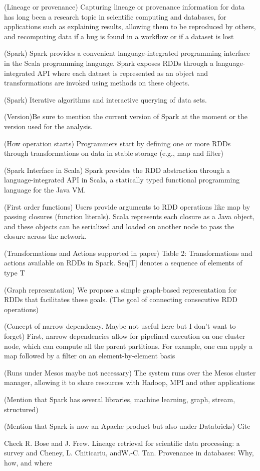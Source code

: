 (Lineage or provenance) Capturing lineage or provenance information for data has long been a research topic in scientific computing and databases, for applications such as explaining results, allowing them to be reproduced by others, and recomputing data if a bug is found in a workflow or if a dataset is lost \cite{Zaharia2012a}

(Spark) Spark provides a convenient language-integrated programming interface in the Scala programming language. Spark exposes RDDs through a language-integrated API where each dataset is represented as an object and transformations are invoked using methods on these objects. \cite{Zaharia2012a}

(Spark) Iterative algorithms and interactive querying of data sets.

(Version)Be sure to mention the current version of Spark at the moment or the version used for the analysis.

(How operation starts) Programmers start by defining one or more RDDs through transformations on data in stable storage (e.g., map and filter) \cite{Zaharia2012a}

(Spark Interface in Scala) Spark provides the RDD abstraction through a language-integrated API in Scala, a statically typed functional programming language for the Java VM. \cite{Zaharia2012a}

(First order functions) Users provide arguments to RDD operations like map by passing closures (function literals). Scala represents each closure as a Java object, and these objects can be serialized and loaded on another node to pass the closure across the network. \cite{Zaharia2012a}

(Transformations and Actions supported in paper) Table 2: Transformations and actions available on RDDs in Spark. Seq[T] denotes a sequence of elements of type T \cite{Zaharia2012a}

(Graph representation) We propose a simple graph-based representation for RDDs that facilitates these goals. (The goal of connecting consecutive RDD operations) \cite{Zaharia2012a}

(Concept of narrow dependency. Maybe not useful here but I don't want to forget) First, narrow dependencies allow for pipelined execution on one cluster node, which can compute all the parent partitions. For example, one can apply a map followed by a filter on an element-by-element basis \cite{Zaharia2012a}

(Runs under Mesos maybe not necessary) The system runs over the Mesos cluster manager, allowing it to share resources with Hadoop, MPI and other applications \cite{Zaharia2012a}

(Mention that Spark has several libraries, machine learning, graph, stream, structured)

(Mention that Spark is now an Apache product but also under Databricks) Cite \cite{WebSpark2017}

Check R. Bose and J. Frew. Lineage retrieval for scientific data processing: a survey and Cheney, L. Chiticariu, andW.-C. Tan. Provenance in databases: Why, how, and where